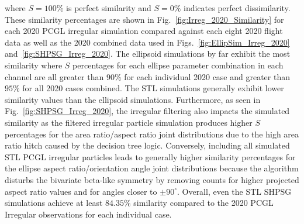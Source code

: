 \documentclass[amt, manuscript]{copernicus}
\begin{document}
where $S = 100\%$ is perfect similarity and $S=0\%$ indicates perfect dissimilarity. These similarity percentages are shown in Fig.~\ref{fig:Irreg_2020_Similarity} for each 2020 PCGL irregular simulation compared against each eight 2020 flight data as well as the 2020 combined data used in Figs.~\ref{fig:EllipSim_Irreg_2020} and~\ref{fig:SHPSG_Irreg_2020}. The ellipsoid simulations by far exhibit the most similarity where $S$ percentages for each ellipse parameter combination in each channel are all greater than $90\%$ for each individual 2020 case and greater than $95\%$ for all 2020 cases combined. The STL simulations generally exhibit lower similarity values than the ellipsoid simulations. Furthermore, as seen in Fig.~\ref{fig:SHPSG_Irreg_2020}, the irregular filtering also impacts the simulated similarity as the filtered irregular particle simulation produces higher $S$ percentages for the area ratio/aspect ratio joint distributions due to the high area ratio hitch caused by the \citet{Schima2024} decision tree logic. Conversely, including all simulated STL PCGL irregular particles leads to generally higher similarity percentages for the ellipse aspect ratio/orientation angle joint distributions because the \citet{Schima2024} algorithm disturbs the bivariate beta-like symmetry by removing counts for higher projected aspect ratio values and for angles closer to $\pm 90^{\circ}$. Overall, even the STL SHPSG simulations achieve at least $84.35\%$ similarity compared to the 2020 PCGL Irregular observations for each individual case.
 
 
\end{document}
